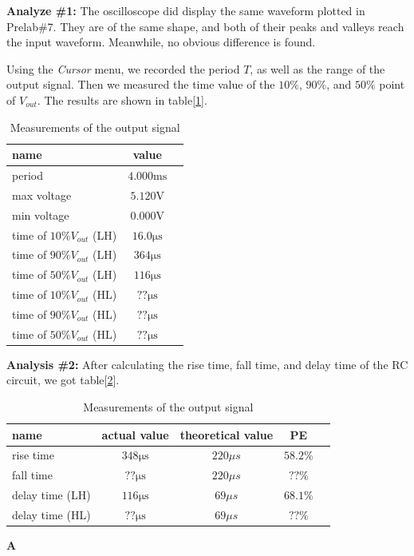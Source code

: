 \textbf{Analyze \#1:} \newline
\phantom{ } The oscilloscope did display the same waveform plotted in Prelab\#7. They are of the same shape, and both of their peaks and valleys reach the input waveform. Meanwhile, no obvious difference is found. \newline

Using the \textit{Cursor} menu, we recorded the period $T$, as well as the range of the output signal. Then we measured the time value of the $10\%$, $90\%$, and $50\%$ point of $V_{out}$. The results are shown in table[\ref{tab:mea}].

\begin{table}[!htbp]
	\centering
	\caption{Measurements of the output signal}
	\begin{tabular}{lcl}
		\toprule
		name & value & \\
		\midrule
		period & $4.000\mathrm{ms}$ & \\
		max voltage & $5.120\mathrm{V}$ & \\
		min voltage & $0.000\mathrm{V}$ & \\
		time of $10\% V_{out}$ (LH) & $16.0\mathrm{\mu s}$ & \\
		time of $90\% V_{out}$ (LH) & $364\mathrm{\mu s}$ & \\
		time of $50\% V_{out}$ (LH) & $116\mathrm{\mu s}$ & \\
		time of $10\% V_{out}$ (HL) & $??\mathrm{\mu s}$ & \\
		time of $90\% V_{out}$ (HL) & $??\mathrm{\mu s}$ & \\
		time of $50\% V_{out}$ (HL) & $??\mathrm{\mu s}$ & \\
		\bottomrule
	\end{tabular}
	\label{tab:mea}
\end{table}

\textbf{Analysis \#2:} \newline
\phantom{ } After calculating the rise time, fall time, and delay time of the RC circuit, we got table[\ref{tab:cal}].

\begin{table}[!htbp]
	\centering
	\caption{Measurements of the output signal}
	\begin{tabular}{lcccl}
		\toprule
		name & actual value & theoretical value & PE & \\
		\midrule
		rise time & $348\mathrm{\mu s}$ & ${220\mu s}$ & $58.2\%$ & \\
		fall time & $??\mathrm{\mu s}$ &  ${220\mu s}$ & $??\%$ & \\
		delay time (LH) & $116\mathrm{\mu s}$ & ${69\mu s}$ & $68.1\%$ & \\
		delay time (HL) & $??\mathrm{\mu s}$ &  ${69\mu s}$ & $??\%$ & \\
		\bottomrule
	\end{tabular}
	\label{tab:cal}
\end{table}

\textbf{A}